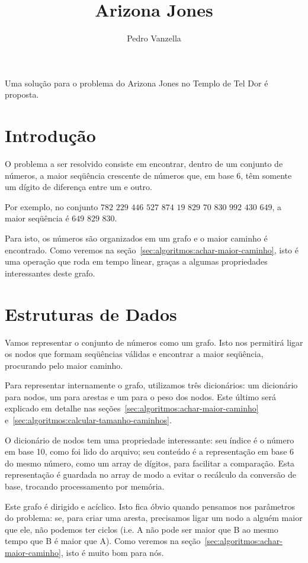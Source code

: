 \documentclass[12pt]{article}
\title{Arizona Jones}
\author{Pedro Vanzella\inst{1}}
\begin{document}
\maketitle
\begin{resumo}
  Uma solu\c{c}ão para o problema do Arizona Jones no Templo de Tel Dor é proposta.
\end{resumo}


\section{Introdução}\label{sec:intro}

O problema a ser resolvido consiste em encontrar, dentro de um conjunto de números, a maior seqüência crescente de números que, em base 6, têm somente um dígito de diferen\c{c}a entre um e outro. 

Por exemplo, no conjunto $782$ $229$ $446$ $527$ $874$ $19$ $829$ $70$ $830$ $992$ $430$ $649$, a maior seqüência é $649$ $829$ $830$.

Para isto, os números são organizados em um grafo e o maior caminho é encontrado. Como veremos na se\c{c}ão~\ref{sec:algoritmos:achar-maior-caminho}, isto é uma opera\c{c}ão que roda em tempo linear, gra\c{c}as a algumas propriedades interessantes deste grafo.

\section{Estruturas de Dados}\label{sec:estruturas}
Vamos representar o conjunto de números como um grafo. Isto nos permitirá ligar os nodos que formam seqüências válidas e encontrar a maior seqüência, procurando pelo maior caminho.

Para representar internamente o grafo, utilizamos três dicionários: um dicionário para nodos, um para arestas e um para o peso dos nodos. Este último será explicado em detalhe nas se\c{c}ões~\ref{sec:algoritmos:achar-maior-caminho} e~\ref{sec:algoritmos:calcular-tamanho-caminhos}.

O dicionário de nodos tem uma propriedade interessante: seu índice é o número em base 10, como foi lido do arquivo; seu conteúdo é a representa\c{c}ão em base 6 do mesmo número, como um array de dígitos, para facilitar a compara\c{c}ão. Esta representa\c{c}ão é guardada no array de modo a evitar o recálculo da conversão de base, trocando processamento por memória.

Este grafo é dirigido e acíclico. Isto fica óbvio quando pensamos nos parâmetros do problema: se, para criar uma aresta, precisamos ligar um nodo a alguém maior que ele, não podemos ter ciclos (i.e. A não pode ser maior que B ao mesmo tempo que B é maior que A). Como veremos na se\c{c}ão~\ref{sec:algoritmos:achar-maior-caminho}, isto é muito bom para nós.
\end{document}

